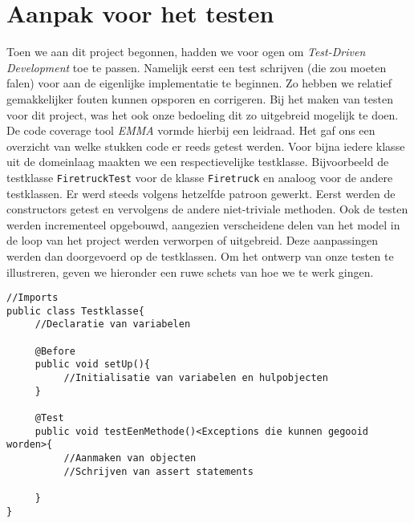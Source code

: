 \section{Aanpak voor het testen}
\label{testen}
Toen we aan dit project begonnen, hadden we voor ogen om \textit{Test-Driven Development} toe te passen.
Namelijk eerst een test schrijven (die zou moeten falen) voor aan de eigenlijke implementatie te beginnen.
Zo hebben we relatief gemakkelijker fouten kunnen opsporen en corrigeren.
Bij het maken van testen voor dit project, was het ook onze bedoeling dit zo uitgebreid mogelijk te doen.
De code coverage tool \textit{EMMA} vormde hierbij een leidraad. Het gaf ons een overzicht van welke stukken code er reeds getest werden.
Voor bijna iedere klasse uit de domeinlaag maakten we een respectievelijke testklasse.
Bijvoorbeeld de testklasse \verb+FiretruckTest+ voor de klasse \verb+Firetruck+ en analoog voor de andere testklassen.
Er werd steeds volgens hetzelfde patroon gewerkt. Eerst werden de constructors getest en vervolgens de andere niet-triviale methoden.
Ook de testen werden incrementeel opgebouwd, aangezien verscheidene delen van het model in de loop van het project werden verworpen of uitgebreid.
Deze aanpassingen werden dan doorgevoerd op de testklassen.
Om het ontwerp van onze testen te illustreren, geven we hieronder een ruwe schets van hoe we te werk gingen.
\begin{verbatim}
//Imports
public class Testklasse{
     //Declaratie van variabelen

     @Before
     public void setUp(){
          //Initialisatie van variabelen en hulpobjecten
     }

     @Test
     public void testEenMethode()<Exceptions die kunnen gegooid worden>{
          //Aanmaken van objecten
          //Schrijven van assert statements

     }
}

\end{verbatim}
